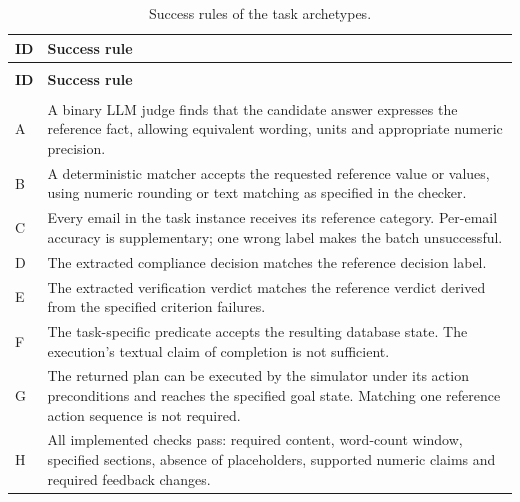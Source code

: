 \begingroup
\renewcommand{\baselinestretch}{1}
\small
\setlength{\tabcolsep}{4pt}
\renewcommand{\arraystretch}{1.08}
\begin{longtable}{>{\raggedright\arraybackslash}p{} >{\raggedright\arraybackslash}p{}}
\caption[Success rules of the task archetypes]{Success rules of the task archetypes.}\label{tab:app-success-rules} \\
\toprule
\textbf{ID} & \textbf{Success rule} \\
\midrule
\endfirsthead
\multicolumn{2}{l}{\tablename~\thetable{} (continued)} \\
\toprule
\textbf{ID} & \textbf{Success rule} \\
\midrule
\endhead
\midrule
\multicolumn{2}{r}{\emph{Continued on the next page.}} \\
\endfoot
\bottomrule
\endlastfoot
A & A binary LLM judge finds that the candidate answer expresses the reference fact, allowing equivalent wording, units and appropriate numeric precision. \\
\addlinespace[2.5pt]
B & A deterministic matcher accepts the requested reference value or values, using numeric rounding or text matching as specified in the checker. \\
\addlinespace[2.5pt]
C & Every email in the task instance receives its reference category. Per-email accuracy is supplementary; one wrong label makes the batch unsuccessful. \\
\addlinespace[2.5pt]
D & The extracted compliance decision matches the reference decision label. \\
\addlinespace[2.5pt]
E & The extracted verification verdict matches the reference verdict derived from the specified criterion failures. \\
\addlinespace[2.5pt]
F & The task-specific predicate accepts the resulting database state. The execution's textual claim of completion is not sufficient. \\
\addlinespace[2.5pt]
G & The returned plan can be executed by the simulator under its action preconditions and reaches the specified goal state. Matching one reference action sequence is not required. \\
\addlinespace[2.5pt]
H & All implemented checks pass: required content, word-count window, specified sections, absence of placeholders, supported numeric claims and required feedback changes. \\
\end{longtable}
\endgroup

